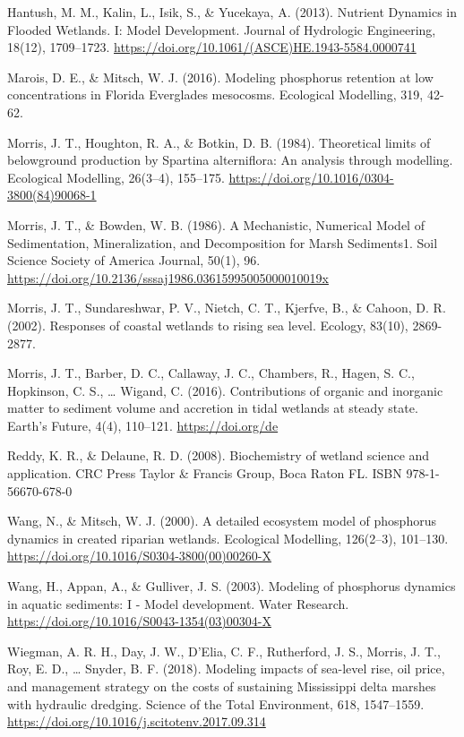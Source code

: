 \documentclass[
]{article}
\begin{document}
Hantush, M. M., Kalin, L., Isik, S., \& Yucekaya, A. (2013). Nutrient
Dynamics in Flooded Wetlands. I: Model Development. Journal of
Hydrologic Engineering, 18(12), 1709--1723.
\url{https://doi.org/10.1061/(ASCE)HE.1943-5584.0000741}

Marois, D. E., \& Mitsch, W. J. (2016). Modeling phosphorus retention at
low concentrations in Florida Everglades mesocosms. Ecological
Modelling, 319, 42-62.

Morris, J. T., Houghton, R. A., \& Botkin, D. B. (1984). Theoretical
limits of belowground production by Spartina alterniflora: An analysis
through modelling. Ecological Modelling, 26(3--4), 155--175.
\url{https://doi.org/10.1016/0304-3800(84)90068-1}

Morris, J. T., \& Bowden, W. B. (1986). A Mechanistic, Numerical Model
of Sedimentation, Mineralization, and Decomposition for Marsh
Sediments1. Soil Science Society of America Journal, 50(1), 96.
\url{https://doi.org/10.2136/sssaj1986.03615995005000010019x}

Morris, J. T., Sundareshwar, P. V., Nietch, C. T., Kjerfve, B., \&
Cahoon, D. R. (2002). Responses of coastal wetlands to rising sea level.
Ecology, 83(10), 2869-2877.

Morris, J. T., Barber, D. C., Callaway, J. C., Chambers, R., Hagen, S.
C., Hopkinson, C. S., \ldots{} Wigand, C. (2016). Contributions of
organic and inorganic matter to sediment volume and accretion in tidal
wetlands at steady state. Earth's Future, 4(4), 110--121.
\url{https://doi.org/de}

Reddy, K. R., \& Delaune, R. D. (2008). Biochemistry of wetland science
and application. CRC Press Taylor \& Francis Group, Boca Raton FL. ISBN
978-1-56670-678-0

Wang, N., \& Mitsch, W. J. (2000). A detailed ecosystem model of
phosphorus dynamics in created riparian wetlands. Ecological Modelling,
126(2--3), 101--130. \url{https://doi.org/10.1016/S0304-3800(00)00260-X}

Wang, H., Appan, A., \& Gulliver, J. S. (2003). Modeling of phosphorus
dynamics in aquatic sediments: I - Model development. Water Research.
\url{https://doi.org/10.1016/S0043-1354(03)00304-X}

Wiegman, A. R. H., Day, J. W., D'Elia, C. F., Rutherford, J. S., Morris,
J. T., Roy, E. D., \ldots{} Snyder, B. F. (2018). Modeling impacts of
sea-level rise, oil price, and management strategy on the costs of
sustaining Mississippi delta marshes with hydraulic dredging. Science of
the Total Environment, 618, 1547--1559.
\url{https://doi.org/10.1016/j.scitotenv.2017.09.314}
\end{document}
